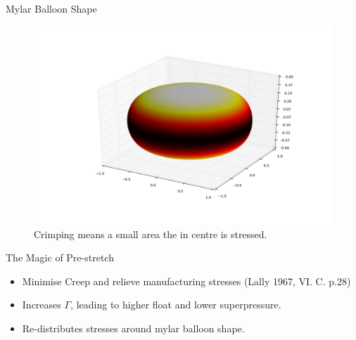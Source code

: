 \documentclass{beamer}
\begin{document}
\begin{frame}{Mylar Balloon Shape}

  \begin{figure}[!ht]
    \centering
    \includegraphics[width=1\textwidth]{mylar_balloon_crimping_hot.png}
    \caption{Crimping means a small area the in centre is stressed. }
  \end{figure}




\end{frame}

\begin{frame}{The Magic of Pre-stretch}


  \begin{itemize}
  \item Minimise Creep and relieve manufacturing stresses (Lally 1967, VI. C. p.28)
  \item Increases $\Gamma$, leading to higher float and lower superpressure.
  \item Re-distributes stresses around mylar balloon shape.


  \end{itemize}

\end{frame}
\end{document}
